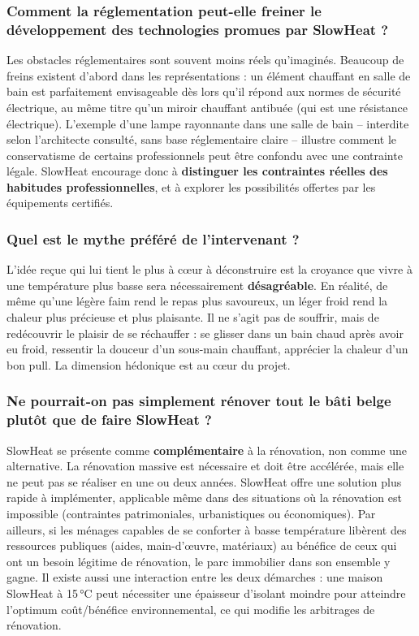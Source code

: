 \subsubsection{Comment la réglementation peut-elle freiner le développement des technologies promues par SlowHeat ?}

Les obstacles réglementaires sont souvent moins réels qu'imaginés. Beaucoup de freins existent d'abord dans les représentations : un élément chauffant en salle de bain est parfaitement envisageable dès lors qu'il répond aux normes de sécurité électrique, au même titre qu'un miroir chauffant antibuée (qui est une résistance électrique). L'exemple d'une lampe rayonnante dans une salle de bain -- interdite selon l'architecte consulté, sans base réglementaire claire -- illustre comment le conservatisme de certains professionnels peut être confondu avec une contrainte légale. SlowHeat encourage donc à \textbf{distinguer les contraintes réelles des habitudes professionnelles}, et à explorer les possibilités offertes par les équipements certifiés.

\subsubsection{Quel est le mythe préféré de l'intervenant ?}

L'idée reçue qui lui tient le plus à cœur à déconstruire est la croyance que vivre à une température plus basse sera nécessairement \textbf{désagréable}. En réalité, de même qu'une légère faim rend le repas plus savoureux, un léger froid rend la chaleur plus précieuse et plus plaisante. Il ne s'agit pas de souffrir, mais de redécouvrir le plaisir de se réchauffer : se glisser dans un bain chaud après avoir eu froid, ressentir la douceur d'un sous-main chauffant, apprécier la chaleur d'un bon pull. La dimension hédonique est au cœur du projet.

\subsubsection{Ne pourrait-on pas simplement rénover tout le bâti belge plutôt que de faire SlowHeat ?}

SlowHeat se présente comme \textbf{complémentaire} à la rénovation, non comme une alternative. La rénovation massive est nécessaire et doit être accélérée, mais elle ne peut pas se réaliser en une ou deux années. SlowHeat offre une solution plus rapide à implémenter, applicable même dans des situations où la rénovation est impossible (contraintes patrimoniales, urbanistiques ou économiques). Par ailleurs, si les ménages capables de se conforter à basse température libèrent des ressources publiques (aides, main-d'œuvre, matériaux) au bénéfice de ceux qui ont un besoin légitime de rénovation, le parc immobilier dans son ensemble y gagne. Il existe aussi une interaction entre les deux démarches : une maison SlowHeat à 15\,°C peut nécessiter une épaisseur d'isolant moindre pour atteindre l'optimum coût/bénéfice environnemental, ce qui modifie les arbitrages de rénovation.

